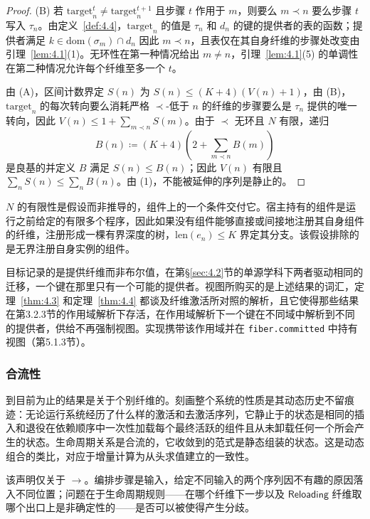 \begin{proof}
(B) 若 $\mathrm{target}^t_n \neq \mathrm{target}^{t+1}_n$ 且步骤 $t$ 作用于 $m$，则要么 $m \prec n$ 要么步骤 $t$ 写入 $\tau_n$。由定义~\ref{def:4.4}，$\mathrm{target}_n$ 的值是 $\tau_n$ 和 $d_n$ 的键的提供者的表的函数；提供者满足 $k \in \mathrm{dom}(\sigma_m) \cap d_n$ 因此 $m \prec n$，且表仅在其自身纤维的步骤处改变由引理~\ref{lem:4.1}(1)。无环性在第一种情况给出 $m \neq n$，引理~\ref{lem:4.1}(5) 的单调性在第二种情况允许每个纤维至多一个 $t$。

由 (A)，区间计数界定 $S(n)$ 为 $S(n) \leqslant (K + 4)(V(n) + 1)$，由 (B)，$\mathrm{target}_n$ 的每次转向要么消耗严格 $\prec$-低于 $n$ 的纤维的步骤要么是 $\tau_n$ 提供的唯一转向，因此 $V(n) \leqslant 1 + \sum_{m \prec n} S(m)$。由于 $\prec$ 无环且 $N$ 有限，递归
\[
B(n) \coloneqq (K + 4)\left(2 + \sum_{m \prec n} B(m)\right)
\]
是良基的并定义 $B$ 满足 $S(n) \leqslant B(n)$；因此 $V(n)$ 有限且 $\sum_n S(n) \leqslant \sum_n B(n)$。由 (1)，不能被延伸的序列是静止的。
\end{proof}

$N$ 的有限性是假设而非推导的，组件上的一个条件交付它。宿主持有的组件是运行之前给定的有限多个程序，因此如果没有组件能够直接或间接地注册其自身组件的纤维，注册形成一棵有界深度的树，$\mathrm{len}(e_n) \leqslant K$ 界定其分支。该假设排除的是无界注册自身实例的组件。

目标记录的是提供纤维而非布尔值，在第\S\ref{sec:4.2}节的单源学科下两者驱动相同的迁移，一个键在那里只有一个可能的提供者。视图所购买的是上述结果的词汇，定理~\ref{thm:4.3} 和定理~\ref{thm:4.4} 都谈及纤维激活所对照的解析，且它使得那些结果在第3.2.3节的作用域解析下存活，在作用域解析下一个键在不同域中解析到不同的提供者，供给不再强制视图。实现携带该作用域并在 \texttt{fiber.committed} 中持有视图（第5.1.3节）。

\subsubsection{合流性}\label{sec:4.4.5}

到目前为止的结果是关于个别纤维的。刻画整个系统的性质是其动态历史不留痕迹：无论运行系统经历了什么样的激活和去激活序列，它静止于的状态是相同的插入和退役在依赖顺序中一次性加载每个最终活跃的组件且从未卸载任何一个所会产生的状态。生命周期关系是合流的，它收敛到的范式是静态组装的状态。这是动态组合的类比，对应于增量计算为从头求值建立的一致性\cite{ref45}。

该声明仅关于 $\longrightarrow$。编排步骤是输入，给定不同输入的两个序列因不有趣的原因落入不同位置；问题在于生命周期规则——在哪个纤维下一步以及 $\mathsf{Reloading}$ 纤维取哪个出口上是非确定性的——是否可以被使得产生分歧。

